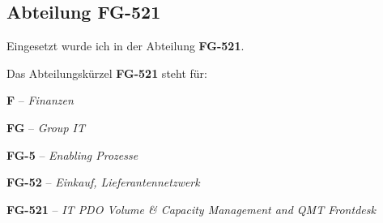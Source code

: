 \documentclass[11pt, a4paper, oneside]{scrartcl}
\begin{document}
        \subsection{Abteilung FG-521}
            \begin{minipage}{\textwidth}
                Eingesetzt wurde ich in der Abteilung \textbf{FG-521}.\par
                Das Abteilungskürzel \textbf{FG-521} steht für:\par
                \textbf{F} -- \textit{Finanzen}\par
                \textbf{FG} -- \textit{Group IT}\par
                \textbf{FG-5} -- \textit{Enabling Prozesse}\par
                \textbf{FG-52} -- \textit{Einkauf, Lieferantennetzwerk}\par
                \textbf{FG-521} -- \textit{IT PDO Volume \& Capacity Management and QMT Frontdesk}
                    \par
            \end{minipage}
\end{document}
